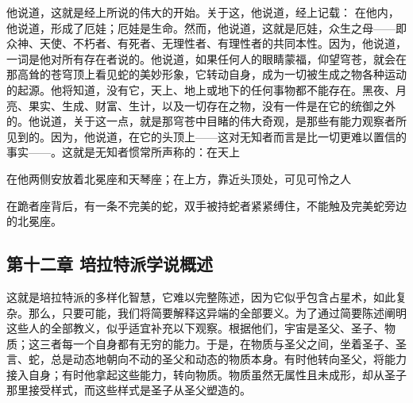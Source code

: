 他说道，这就是经上所说的伟大的开始。关于这，他说道，经上记载： 在他内，他说道，形成了厄娃；厄娃是生命。然而，他说道，这就是厄娃，众生之母——即众神、天使、不朽者、有死者、无理性者、有理性者的共同本性。因为，他说道，一词是他对所有存在者说的。他说道，如果任何人的眼睛蒙福，仰望穹苍，就会在那高耸的苍穹顶上看见蛇的美妙形象，它转动自身，成为一切被生成之物各种运动的起源。他将知道，没有它，天上、地上或地下的任何事物都不能存在。黑夜、月亮、果实、生成、财富、生计，以及一切存在之物，没有一件是在它的统御之外的。他说道，关于这一点，就是那穹苍中目睹的伟大奇观，是那些有能力观察者所见到的。因为，他说道，在它的头顶上——这对无知者而言是比一切更难以置信的事实——。这就是无知者惯常所声称的：在天上\par

\newline{} 在他两侧安放着北冕座和天琴座；在上方，靠近头顶处，可见可怜之人\newline{} \par

在跪者座背后，有一条不完美的蛇，双手被持蛇者紧紧缚住，不能触及完美蛇旁边的北冕座。\par


\subsection{第十二章 培拉特派学说概述}

这就是培拉特派的多样化智慧，它难以完整陈述，因为它似乎包含占星术，如此复杂。那么，只要可能，我们将简要解释这异端的全部要义。为了通过简要陈述阐明这些人的全部教义，似乎适宜补充以下观察。根据他们，宇宙是圣父、圣子、物质；这三者每一个自身都有无穷的能力。于是，在物质与圣父之间，坐着圣子、圣言、蛇，总是动态地朝向不动的圣父和动态的物质本身。有时他转向圣父，将能力接入自身；有时他拿起这些能力，转向物质。物质虽然无属性且未成形，却从圣子那里接受样式，而这些样式是圣子从圣父塑造的。\par

